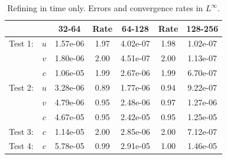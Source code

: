 \documentclass[final]{siamltex}
\begin{document}
\begin{table}[h]
\begin{center}
\caption{Refining in time only.  Errors and convergence rates in $L^\infty$.}
\begin{tabular}{ccccccc}
& & 32-64 & Rate & 64-128 & Rate & 128-256 \\
\hline
Test 1:             & $u$ & 1.57e-06 & 1.97 & 4.02e-07 & 1.98 & 1.02e-07 \\
                    & $v$ & 1.80e-06 & 2.00 & 4.51e-07 & 2.00 & 1.13e-07 \\
                    & $c$ & 1.06e-05 & 1.99 & 2.67e-06 & 1.99 & 6.70e-07 \\
\hline
Test 2:             & $u$ & 3.28e-06 & 0.89 & 1.77e-06 & 0.94 & 9.22e-07 \\
                    & $v$ & 4.79e-06 & 0.95 & 2.48e-06 & 0.97 & 1.27e-06 \\
                    & $c$ & 4.67e-05 & 0.95 & 2.42e-05 & 0.95 & 1.25e-05 \\
\hline
Test 3:             & $c$ & 1.14e-05 & 2.00 & 2.85e-06 & 2.00 & 7.12e-07 \\
\hline
Test 4:             & $c$ & 5.78e-05 & 0.99 & 2.91e-05 & 1.00 & 1.46e-05
\end{tabular}
\end{center}
\end{table}
\end{document}
